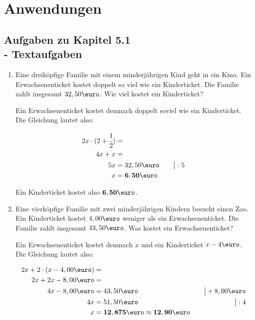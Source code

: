 \documentclass[a4paper,10pt]{article} %
\begin{document}
\begin{enumerate}[label=\alph*)]
\end{enumerate}

\section{Anwendungen}

\subsection{Aufgaben zu Kapitel 5.1 \\
  - Textaufgaben}

\begin{enumerate}

  \item Eine dreiköpfige Familie mit einem minderjährigen Kind geht in ein Kino.
    Ein Erwachsenenticket kostet doppelt so viel wie ein Kinderticket.
    Die Familie zahlt insgesamt \(32,50\text{\euro}\). Wie viel kostet ein Kinderticket?

    Ein Erwachsenenticket kostet demnach doppelt soviel wie ein Kinderticket.
    Die Gleichung lautet also:

    \[
      \begin{aligned}
        2x \cdot (2 + \cfrac{1}{2}) &= \\
        4x + x &= \\
        5x &= 32,50\text{\euro} &\quad\big| : 5 \\
        x &= \mathbf{6,50\text{\euro}}
      \end{aligned}
    \]

    Ein Kinderticket kostet also \(\mathbf{6,50\text{\euro}}\).

  \item Eine vierköpfige Familie mit zwei minderjährigen Kindern besucht einen Zoo.
    Ein Kinderticket kostet \(4,00\text{\euro}\) weniger als ein Erwachsenenticket.
    Die Familie zahlt insgesamt \(43,50\text{\euro}\). Was kostet ein Erwachsenenticket?

    Ein Erwachsenenticket kostet demnach \(x\) und ein Kinderticket \(x - 4\text{\euro}\).
    Die Gleichung lautet also:

    \[
      \begin{aligned}
        2x + 2 \cdot (x - 4,00\text{\euro}) &= \\
        2x + 2x - 8,00\text{\euro} &= \\
        4x - 8,00\text{\euro} &= 43,50\text{\euro} &\quad\big| + 8,00\text{\euro} \\
        4x &= 51,50\text{\euro} &\quad\big| : 4 \\
        x &= \mathbf{12,875\text{\euro}} \approx \mathbf{12,90\text{\euro}}
      \end{aligned}
    \]


\end{enumerate}
\end{document}
